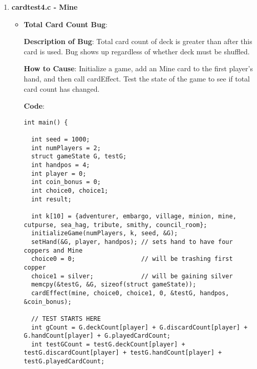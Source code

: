 \documentclass[11pt,letterpaper]{article}
\begin{document}
\begin{enumerate}[label=\Roman*.]
\begin{enumerate}
\begin{itemize}[leftmargin=*]
\begin{lstlisting}
  ... <same initialization code as above> ...

  if (testG.playedCardCount == G.playedCardCount + 1) {
    if (testG.playedCards[testG.playedCardCount - 1] == great_hall)
      printf("\tPASSED: Great Hall card was properly played, i.e. added to playedCard array\n");
    else
      printf("\t\u274CFAILED: Great Hall card was not properly played, i.e. added to playedCard array\n");
  } 
  else printf("\t\u274CFAILED: Great Hall card was not properly played, i.e. added to playedCard array\n");
          \end{lstlisting}
        \end{itemize}

      \item \textbf{cardtest4.c - Mine}

        \begin{itemize}[leftmargin=*]

        \item \textbf{Total Card Count Bug}:

        \textbf{Description of Bug}: Total card count of deck is greater than after
            this card is used. Bug shows up regardless of whether deck must
            be shuffled.

        \textbf{How to Cause}: Initialize a game, add an Mine card to 
          the first player's hand, and then call cardEffect.
          Test the state of the game to see if total card count has changed.

        \textbf{Code}:

          \begin{lstlisting}
int main() {
  
  int seed = 1000;                      
  int numPlayers = 2;                   
  struct gameState G, testG;   
  int handpos = 4;                    
  int player = 0;                    
  int coin_bonus = 0;
  int choice0, choice1;  
  int result;            

  int k[10] = {adventurer, embargo, village, minion, mine, cutpurse, sea_hag, tribute, smithy, council_room};
  initializeGame(numPlayers, k, seed, &G);
  setHand(&G, player, handpos); // sets hand to have four coppers and Mine
  choice0 = 0;                  // will be trashing first copper
  choice1 = silver;             // will be gaining silver 
  memcpy(&testG, &G, sizeof(struct gameState)); 
  cardEffect(mine, choice0, choice1, 0, &testG, handpos, &coin_bonus); 
  
  // TEST STARTS HERE
  int gCount = G.deckCount[player] + G.discardCount[player] + G.handCount[player] + G.playedCardCount;
  int testGCount = testG.deckCount[player] + testG.discardCount[player] + testG.handCount[player] + testG.playedCardCount;
  

\end{lstlisting}
\end{itemize}
\end{enumerate}
\end{enumerate}
\end{document}
